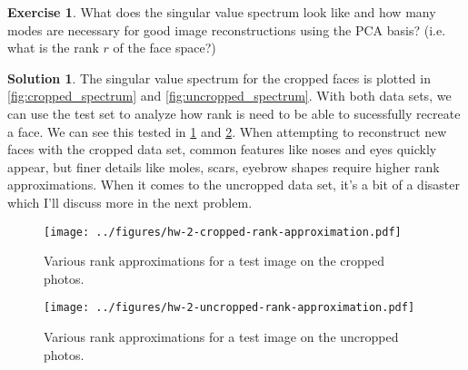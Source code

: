 \documentclass[12pt]{article}
\theoremstyle{definition}
\newtheorem{exer}{Exercise}
\newtheorem{sol}{Solution}
\theoremstyle{remark}
\begin{document}
\begin{exer}
What does the singular value spectrum look like and how many modes are necessary for good image
reconstructions using the PCA basis? (i.e. what is the rank $r$ of the face space?)
\end{exer}
\begin{sol}
    The singular value spectrum for the cropped faces is plotted in \ref{fig:cropped_spectrum} and \ref{fig:uncropped_spectrum}. With both data sets, we can use the test set to analyze how rank is need to be able to sucessfully recreate a face. We can see this tested in \cref{fig:cropped-rank-approximation} and \cref{fig:uncropped-rank-approximation}. When attempting to reconstruct new faces with the cropped data set, common features like noses and eyes quickly appear, but finer details like moles, scars, eyebrow shapes require higher rank approximations. When it comes to the uncropped data set, it's a bit of a disaster which I'll discuss more in the next problem.

    \begin{figure}[h]
        \centering
        \texttt{[image: ../figures/hw-2-cropped-rank-approximation.pdf]}
        \caption{Various rank approximations for a test image on the cropped photos.}%
        \label{fig:cropped-rank-approximation}
    \end{figure}
    \begin{figure}[h]
        \centering
        \texttt{[image: ../figures/hw-2-uncropped-rank-approximation.pdf]}
        \caption{Various rank approximations for a test image on the uncropped photos.}%
        \label{fig:uncropped-rank-approximation}
    \end{figure}


\end{sol}
\end{document}
